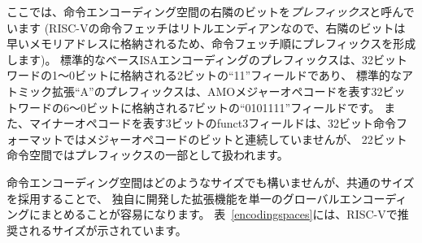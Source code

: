\begin{comment}
We use the term {\em prefix} to refer to the bits to the {\em right}
of an instruction encoding space (since instruction fetch in RISC-V is
little-endian, the
bits to the right are stored at earlier memory addresses, hence form a
prefix in instruction-fetch order).  The prefix for the standard base
ISA encoding is the two-bit ``11'' field held in bits 1--0 of the
32-bit word, while the prefix for the standard atomic extension ``A''
is the seven-bit ``0101111'' field held in bits 6--0 of the 32-bit
word representing the AMO major opcode.  A quirk of the encoding
format is that the 3-bit funct3 field used to encode a minor opcode is
not contiguous with the major opcode bits in the 32-bit instruction
format, but is considered part of the prefix for 22-bit instruction
spaces.
\end{comment}
ここでは、命令エンコーディング空間の右隣のビットを{\em プレフィックス}と呼んでいます
(RISC-Vの命令フェッチはリトルエンディアンなので、右隣のビットは早いメモリアドレスに格納されるため、命令フェッチ順にプレフィックスを形成します)。
標準的なベースISAエンコーディングのプレフィックスは、32ビットワードの1～0ビットに格納される2ビットの``11''フィールドであり、
標準的なアトミック拡張``A''のプレフィックスは、AMOメジャーオペコードを表す32ビットワードの6～0ビットに格納される7ビットの``0101111''フィールドです。
また、マイナーオペコードを表す3ビットのfunct3フィールドは、32ビット命令フォーマットではメジャーオペコードのビットと連続していませんが、
22ビット命令空間ではプレフィックスの一部として扱われます。

\begin{comment}
Although an instruction encoding space could be of any size, adopting
a smaller set of common sizes simplifies packing independently
developed extensions into a single global encoding.
Table~\ref{encodingspaces} gives the suggested sizes for RISC-V.
\end{comment}
命令エンコーディング空間はどのようなサイズでも構いませんが、共通のサイズを採用することで、
独自に開発した拡張機能を単一のグローバルエンコーディングにまとめることが容易になります。
表~\ref{encodingspaces}には、RISC-Vで推奨されるサイズが示されています。

